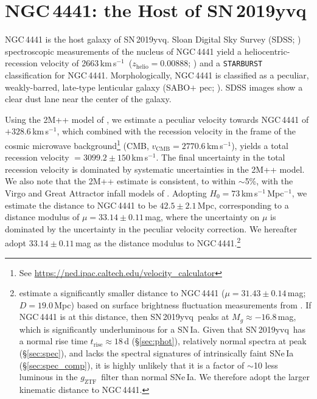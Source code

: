 \documentclass[twocolumn]{aastex63}
\newcommand{\fromkate}[1]{{\color{brown} fromKM: {#1}}}
\newcommand{\todo}[1]{{\color{magenta} to-do: {#1}}}
\newcommand{\gztf}{$g_\mathrm{ZTF}$}
\newcommand{\kms}{km\,s$^{-1}$}
\newcommand{\sn}{SN\,2019yvq}
\begin{document}
\section{NGC\,4441: the Host of \sn}\label{sec:host}

NGC\,4441 is the host galaxy of \sn. Sloan Digital Sky Survey (SDSS;
\citealt{York00}) spectroscopic measurements of the nucleus of NGC\,4441
yield a heliocentric-recession velocity of 2663\,\kms\ ($z_\mathrm{helio} =
0.00888$; \citealt{Abolfathi18}) and a \texttt{STARBURST} classification for
NGC\,4441. Morphologically, NGC\,4441 is classified as a peculiar,
weakly-barred, late-type lenticular galaxy (SABO$+$ pec;
\citealt{de-Vaucouleurs91}). SDSS images show a clear dust lane near the
center of the galaxy.

Using the 2M++ model of \citet{Carrick15}, we estimate a peculiar velocity
towards NGC\,4441 of $+328.6$\,\kms, which combined with the recession
velocity in the frame of the cosmic microwave background\footnote{See
\url{https://ned.ipac.caltech.edu/velocity_calculator}} (CMB, $v_\mathrm{CMB}
= 2770.6$\,\kms), yields a total recession velocity $= 3099.2 \pm 150$\,\kms.
The final uncertainty in the total recession velocity is dominated by
systematic uncertainties in the 2M++ model. We also note that the 2M++
estimate is consistent, to within $\sim$5\%, with the Virgo and Great
Attractor infall models of \citet{Mould00}. Adopting $H_0 =
73$\,\kms\,Mpc$^{-1}$, we estimate the distance to NGC\,4441 to be $42.5 \pm
2.1$\,Mpc, corresponding to a distance modulus of $\mu = 33.14 \pm 0.11$\,mag,
where the uncertainty on $\mu$ is dominated by the uncertainty in the peculiar
velocity correction. We hereafter adopt $33.14 \pm 0.11$\,mag as the distance
modulus to NGC\,4441.\footnote{\citet{Tully13} estimate a significantly
smaller distance to NGC\,4441 ($\mu = 31.43 \pm 0.14$\,mag; $D = 19.0$\,Mpc)
based on surface brightness fluctuation measurements from \citet{Tonry01}. If
NGC\,4441 is at this distance, then \sn\ peaks at $M_g \approx -16.8$\,mag,
which is significantly underluminous for a SN\,Ia. Given that \sn\ has a
normal rise time $t_\mathrm{rise} \approx 18$\,d (\S\ref{sec:phot}),
relatively normal spectra at peak (\S\ref{sec:spec}), and lacks the spectral
signatures of intrinsically faint SNe\,Ia (\S\ref{sec:spec_comp}), it is
highly unlikely that it is a factor of $\sim$10 less luminous in the \gztf\
filter than normal SNe\,Ia. We therefore adopt the larger kinematic distance
to NGC\,4441.}
\end{document}

